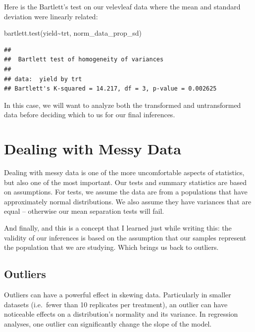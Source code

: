 \documentclass[
]{book}
\newenvironment{Shaded}{\begin{snugshade}}{\end{snugshade}}
\newcommand{\FunctionTok}[1]{\textcolor[rgb]{0.00,0.00,0.00}{#1}}
\newcommand{\NormalTok}[1]{#1}
\newcommand{\SpecialCharTok}[1]{\textcolor[rgb]{0.00,0.00,0.00}{#1}}
\begin{document}
Here is the Bartlett's test on our velevleaf data where the mean and standard deviation were linearly related:

\begin{Shaded}
\begin{Highlighting}[]
\FunctionTok{bartlett.test}\NormalTok{(yield}\SpecialCharTok{\textasciitilde{}}\NormalTok{trt, norm\_data\_prop\_sd)}
\end{Highlighting}
\end{Shaded}

\begin{verbatim}
## 
##  Bartlett test of homogeneity of variances
## 
## data:  yield by trt
## Bartlett's K-squared = 14.217, df = 3, p-value = 0.002625
\end{verbatim}

In this case, we will want to analyze both the transformed and untransformed data before deciding which to us for our final inferences.

\hypertarget{dealing-with-messy-data}{%
\section{Dealing with Messy Data}\label{dealing-with-messy-data}}

Dealing with messy data is one of the more uncomfortable aspects of statistics, but also one of the most important. Our tests and summary statistics are based on assumptions. For tests, we assume the data are from a populations that have approximately normal distributions. We also assume they have variances that are equal -- otherwise our mean separation tests will fail.

And finally, and this is a concept that I learned just while writing this: the validity of our inferences is based on the assumption that our samples represent the population that we are studying. Which brings us back to outliers.

\hypertarget{outliers}{%
\subsection{Outliers}\label{outliers}}

Outliers can have a powerful effect in skewing data. Particularly in smaller datasets (i.e.~fewer than 10 replicates per treatment), an outlier can have noticeable effects on a distribution's normality and its variance. In regression analyses, one outlier can significantly change the slope of the model.
\end{document}
